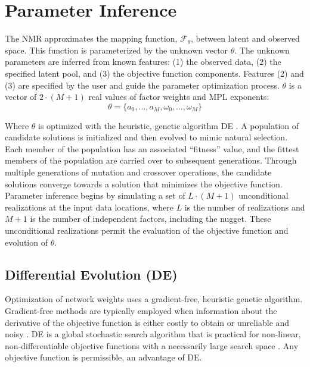 \FloatBarrier
\section{Parameter Inference}
\label{sec:04paraminfer}

The \gls{NMR} approximates the mapping function, $\mathcal{F}_{\theta}$, between latent and observed space. This function is parameterized by the unknown vector $\theta$. The unknown parameters are inferred from known features: (1) the observed data, (2) the specified latent pool, and (3) the objective function components. Features (2) and (3) are specified by the user and guide the parameter optimization process. $\theta$ is a vector of $2 \cdot (M+1)$ real values of factor weights and \gls{MPL} exponents:
\begin{equation}
    \theta = \{ a_{0}, \dots, a_{M}, \omega_{0}, \dots, \omega_{M} \}
    \label{eq:theta}
\end{equation}

Where $\theta$ is optimized with the heuristic, genetic algorithm \gls{DE} \citep{price2013differential}. A population of candidate solutions is initialized and then evolved to mimic natural selection. Each member of the population has an associated ``fitness'' value, and the fittest members of the population are carried over to subsequent generations. Through multiple generations of mutation and crossover operations, the candidate solutions converge towards a solution that minimizes the objective function. Parameter inference begins by simulating a set of $L \cdot (M+1)$ unconditional realizations at the input data locations, where $L$ is the number of realizations and $M+1$ is the number of independent factors, including the nugget. These unconditional realizations permit the evaluation of the objective function and evolution of $\theta$.

\subsection{Differential Evolution (DE)}
\label{subsec:04de}

Optimization of network weights uses a gradient-free, heuristic genetic algorithm. Gradient-free methods are typically employed when information about the derivative of the objective function is either costly to obtain or unreliable and noisy \citep{conn2009introduction}. \Acrfull{DE} is a global stochastic search algorithm that is practical for non-linear, non-differentiable objective functions with a necessarily large search space \citep{rios2013derivativefree}. Any objective function is permissible, an advantage of \gls{DE}.

